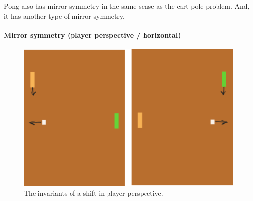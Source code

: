 Pong also has mirror symmetry in the same sense as the cart pole problem.
And, it has another type of mirror symmetry.

%
%
%
%
%


\paragraph{Mirror symmetry (player perspective / horizontal)}

\begin{figure}
\centering
\includegraphics[width=1\textwidth,height=0.25\textheight]{../../pictures/drawings/pong-horz-flip.png}
\caption{The invariants of a shift in player perspective.}
\end{figure}

